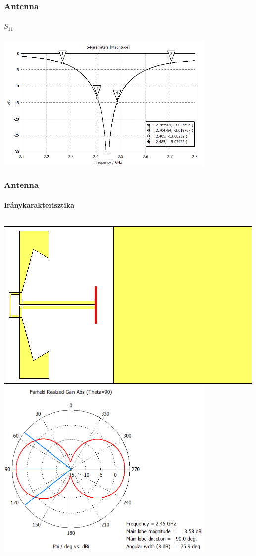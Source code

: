 \documentclass[aspectratio=43]{beamer}
\begin{document}
\begin{frame}
	\frametitle{Antenna}
	\framesubtitle{$S_{11}$}
		\centering
		\includegraphics[width=0.8\textwidth]{bifa_broadband_S11_dB.png}
\end{frame}
\begin{frame}
	\frametitle{Antenna}
	\framesubtitle{Iránykarakterisztika}
		\begin{columns}
				\centering
				\includegraphics[width=\textwidth]{lying_bifa_bb_3D.png}
				\centering
				\includegraphics[width=0.8\textwidth]{bifa_broadband_pattern_theta90.png}
		\end{columns}
\end{frame}
\end{document}
